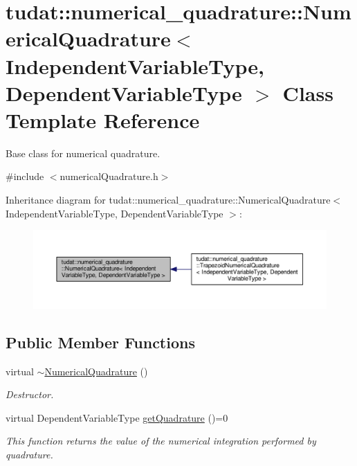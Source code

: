 \hypertarget{classtudat_1_1numerical__quadrature_1_1NumericalQuadrature}{}\section{tudat\+:\+:numerical\+\_\+quadrature\+:\+:Numerical\+Quadrature$<$ Independent\+Variable\+Type, Dependent\+Variable\+Type $>$ Class Template Reference}
\label{classtudat_1_1numerical__quadrature_1_1NumericalQuadrature}


Base class for numerical quadrature.  




{\ttfamily \#include $<$numerical\+Quadrature.\+h$>$}



Inheritance diagram for tudat\+:\+:numerical\+\_\+quadrature\+:\+:Numerical\+Quadrature$<$ Independent\+Variable\+Type, Dependent\+Variable\+Type $>$\+:
\nopagebreak
\begin{figure}[H]
\begin{center}
\leavevmode
\includegraphics[width=350pt]{classtudat_1_1numerical__quadrature_1_1NumericalQuadrature__inherit__graph}
\end{center}
\end{figure}
\subsection*{Public Member Functions}
\begin{DoxyCompactItemize}
\item 
virtual \hyperlink{classtudat_1_1numerical__quadrature_1_1NumericalQuadrature_a602011cbb2341401407f5221bc016a79}{$\sim$\+Numerical\+Quadrature} ()\hypertarget{classtudat_1_1numerical__quadrature_1_1NumericalQuadrature_a602011cbb2341401407f5221bc016a79}{}\label{classtudat_1_1numerical__quadrature_1_1NumericalQuadrature_a602011cbb2341401407f5221bc016a79}

\begin{DoxyCompactList}\small\item\em Destructor. \end{DoxyCompactList}\item 
virtual Dependent\+Variable\+Type \hyperlink{classtudat_1_1numerical__quadrature_1_1NumericalQuadrature_ab47826b9612a50e5dfc1b1c17d0d0b1c}{get\+Quadrature} ()=0
\begin{DoxyCompactList}\small\item\em This function returns the value of the numerical integration performed by quadrature. \end{DoxyCompactList}\end{DoxyCompactItemize}
